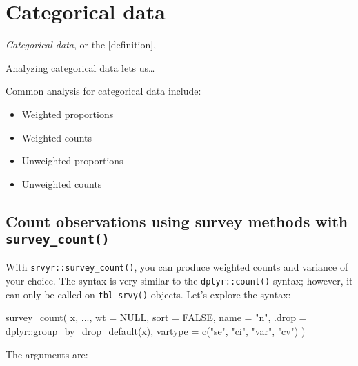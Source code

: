\documentclass[
]{krantz}
\makeatletter
\newenvironment{Shaded}{\begin{snugshade}}{\end{snugshade}}
\newcommand{\AttributeTok}[1]{\textcolor[rgb]{0.61,0.61,0.61}{#1}}
\newcommand{\ConstantTok}[1]{\textcolor[rgb]{0,0,0}{#1}}
\newcommand{\FunctionTok}[1]{\textcolor[rgb]{0,0,0}{#1}}
\newcommand{\NormalTok}[1]{#1}
\newcommand{\SpecialCharTok}[1]{\textcolor[rgb]{0,0,0}{#1}}
\newcommand{\StringTok}[1]{\textcolor[rgb]{0.5,0.5,0.5}{#1}}
\providecommand{\tightlist}{%
  \setlength{\itemsep}{0pt}\setlength{\parskip}{0pt}}
\newenvironment{kframe}{%
\medskip{}
\setlength{\fboxsep}{.8em}
 \def\at@end@of@kframe{}%
 \ifinner\ifhmode%
  \def\at@end@of@kframe{\end{minipage}}%
  \begin{minipage}{\columnwidth}%
 \fi\fi%
 \def\FrameCommand##1{\hskip\@totalleftmargin \hskip-\fboxsep
 \colorbox{shadecolor}{##1}\hskip-\fboxsep
     \hskip-\linewidth \hskip-\@totalleftmargin \hskip\columnwidth}%
 \MakeFramed {\advance\hsize-\width
   \@totalleftmargin\z@ \linewidth\hsize
   \@setminipage}}%
 {\par\unskip\endMakeFramed%
 \at@end@of@kframe}
\renewenvironment{Shaded}{\begin{kframe}}{\end{kframe}}
\makeatother
\begin{document}
\hypertarget{categorical-data}{%
\section{Categorical data}\label{categorical-data}}

\emph{Categorical data}, or the {[}definition{]},

Analyzing categorical data lets us\ldots{}

Common analysis for categorical data include:

\begin{itemize}
\tightlist
\item
  Weighted proportions
\item
  Weighted counts
\item
  Unweighted proportions
\item
  Unweighted counts
\end{itemize}

\hypertarget{count-observations-using-survey-methods-with-survey_count}{%
\subsection{\texorpdfstring{Count observations using survey methods with \texttt{survey\_count()}}{Count observations using survey methods with survey\_count()}}\label{count-observations-using-survey-methods-with-survey_count}}

With \texttt{srvyr::survey\_count()}, you can produce weighted counts and variance of your choice. The syntax is very similar to the \texttt{dplyr::count()} syntax; however, it can only be called on \texttt{tbl\_srvy()} objects. Let's explore the syntax:

\begin{Shaded}
\begin{Highlighting}[]
\FunctionTok{survey\_count}\NormalTok{(}
\NormalTok{  x,}
\NormalTok{  ...,}
  \AttributeTok{wt =} \ConstantTok{NULL}\NormalTok{,}
  \AttributeTok{sort =} \ConstantTok{FALSE}\NormalTok{,}
  \AttributeTok{name =} \StringTok{"n"}\NormalTok{,}
  \AttributeTok{.drop =}\NormalTok{ dplyr}\SpecialCharTok{::}\FunctionTok{group\_by\_drop\_default}\NormalTok{(x),}
  \AttributeTok{vartype =} \FunctionTok{c}\NormalTok{(}\StringTok{"se"}\NormalTok{, }\StringTok{"ci"}\NormalTok{, }\StringTok{"var"}\NormalTok{, }\StringTok{"cv"}\NormalTok{)}
\NormalTok{  )}
\end{Highlighting}
\end{Shaded}

The arguments are:
\end{document}
